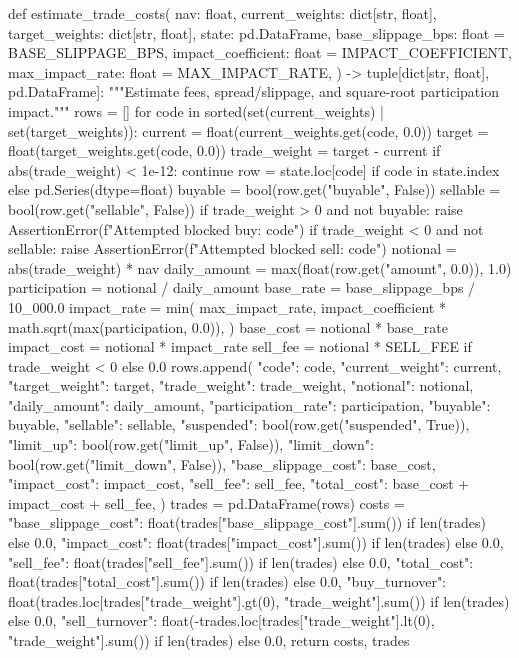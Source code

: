 \documentclass[UTF8,a4paper,fontset=fandol]{ctexart}
\begin{document}
\begin{ProjectCode}
def estimate_trade_costs(
    nav: float,
    current_weights: dict[str, float],
    target_weights: dict[str, float],
    state: pd.DataFrame,
    base_slippage_bps: float = BASE_SLIPPAGE_BPS,
    impact_coefficient: float = IMPACT_COEFFICIENT,
    max_impact_rate: float = MAX_IMPACT_RATE,
) -> tuple[dict[str, float], pd.DataFrame]:
    """Estimate fees, spread/slippage, and square-root participation impact."""
    rows = []
    for code in sorted(set(current_weights) | set(target_weights)):
        current = float(current_weights.get(code, 0.0))
        target = float(target_weights.get(code, 0.0))
        trade_weight = target - current
        if abs(trade_weight) < 1e-12:
            continue
        row = state.loc[code] if code in state.index else pd.Series(dtype=float)
        buyable = bool(row.get("buyable", False))
        sellable = bool(row.get("sellable", False))
        if trade_weight > 0 and not buyable:
            raise AssertionError(f"Attempted blocked buy: {code}")
        if trade_weight < 0 and not sellable:
            raise AssertionError(f"Attempted blocked sell: {code}")
        notional = abs(trade_weight) * nav
        daily_amount = max(float(row.get("amount", 0.0)), 1.0)
        participation = notional / daily_amount
        base_rate = base_slippage_bps / 10_000.0
        impact_rate = min(
            max_impact_rate,
            impact_coefficient * math.sqrt(max(participation, 0.0)),
        )
        base_cost = notional * base_rate
        impact_cost = notional * impact_rate
        sell_fee = notional * SELL_FEE if trade_weight < 0 else 0.0
        rows.append({
            "code": code,
            "current_weight": current,
            "target_weight": target,
            "trade_weight": trade_weight,
            "notional": notional,
            "daily_amount": daily_amount,
            "participation_rate": participation,
            "buyable": buyable,
            "sellable": sellable,
            "suspended": bool(row.get("suspended", True)),
            "limit_up": bool(row.get("limit_up", False)),
            "limit_down": bool(row.get("limit_down", False)),
            "base_slippage_cost": base_cost,
            "impact_cost": impact_cost,
            "sell_fee": sell_fee,
            "total_cost": base_cost + impact_cost + sell_fee,
        })
    trades = pd.DataFrame(rows)
    costs = {
        "base_slippage_cost": float(trades["base_slippage_cost"].sum()) if len(trades) else 0.0,
        "impact_cost": float(trades["impact_cost"].sum()) if len(trades) else 0.0,
        "sell_fee": float(trades["sell_fee"].sum()) if len(trades) else 0.0,
        "total_cost": float(trades["total_cost"].sum()) if len(trades) else 0.0,
        "buy_turnover": float(trades.loc[trades["trade_weight"].gt(0), "trade_weight"].sum()) if len(trades) else 0.0,
        "sell_turnover": float(-trades.loc[trades["trade_weight"].lt(0), "trade_weight"].sum()) if len(trades) else 0.0,
    }
    return costs, trades



\end{ProjectCode}
\end{document}
